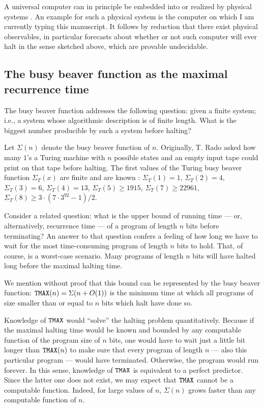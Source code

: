 \documentclass[rmp,amsfonts,showpacs,showkeys]{revtex4}
\begin{document}
A universal computer can in principle be embedded into or realized by
physical systems \cite{moore}.
An example for such a physical system is the computer
on which I am currently typing this manuscript.
It follows by reduction that there exist physical observables,
in particular forecasts about whether or not such computer will ever
halt in the sense sketched above,
which are provable undecidable.




\subsection{The busy beaver function as the maximal recurrence time}

The busy beaver function \cite{rado,chaitin-ACM,dewdney,brady}
addresses the following
question: given a finite system;
i.e., a system whose algorithmic description is of finite length.
What is the biggest number producible by such a system before halting?

Let $\Sigma (n)$ denote the busy beaver function of $n$.
 Originally, T. Rado \cite{rado}
 asked how
 many $1$'s a Turing machine with $n$ possible states and an empty
 input tape
 could print on that tape before halting.
 The first values of the Turing busy beaver function $\Sigma _T(x)$
 are finite and are known \cite{dewdney,brady}:
  $\Sigma _T(1)=1$,
 $\Sigma _T(2)= 4$,
  $\Sigma _T(3)=6$,
 $\Sigma _T(4)= 13$,
 $\Sigma _T(5) \ge 1915$,
 $\Sigma_T(7)\ge 22961$,
 $\Sigma_T(8)\ge 3\cdot (7\cdot 3^{92}-1)/2$.

Consider a related question: what is the upper bound of running time --- or,
alternatively, recurrence time --- of a program of length $n$ bits before
terminating?
An answer to that question confers a feeling of how long we have to
wait for the most time-consuming program of length $n$ bits to
hold. That, of course, is a worst-case scenario. Many programs of
length $n$ bits will have halted long  before the maximal halting time.

We mention without proof \cite{chaitin-ACM,chaitin-bb}  that
this bound can be represented by the busy beaver function:
${\tt TMAX}(n)=\Sigma (n+O(1))$ is the minimum time at which all
programs of size smaller than or equal to $n$ bits which halt have done so.

Knowledge of ${\tt TMAX}$ would ``solve'' the halting
problem quantitatively.
Because if the maximal halting time would be known
and bounded by any computable function of the program size of $n$ bits,
one would have to wait
just a little bit longer than ${\tt TMAX}(n)$ to make sure
that every program of length $n$ --- also this particular program ---
would have terminated.
Otherwise, the program would run forever.
In this sense, knowledge of ${\tt TMAX}$ is equivalent to  a
perfect predictor. Since the latter one does not exist,
we may expect that ${\tt TMAX}$ cannot be a computable function.
Indeed, for large values of $n$, $\Sigma (n)$
grows faster than any computable function  of $n$.
\end{document}
